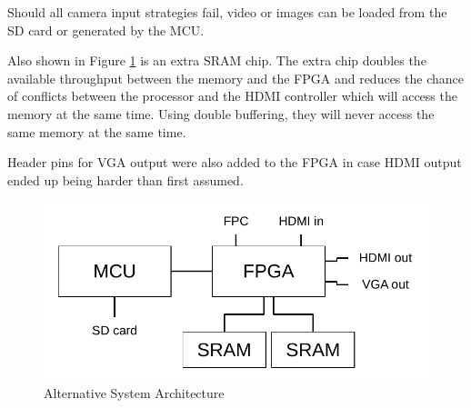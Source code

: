 Should all camera input strategies fail, video or images can be loaded from the SD card or generated by the MCU.

Also shown in Figure \ref{fig:SystemArchitectureAlternative} is an extra SRAM chip.
The extra chip doubles the available throughput between the memory and the FPGA and reduces the chance of conflicts between the processor and the HDMI controller which will access the memory at the same time. Using double buffering, they will never access the same memory at the same time.

Header pins for VGA output were also added to the FPGA in case HDMI output ended up being harder than first assumed.

\begin{figure}
    \centering
    \includegraphics{img/SystemArchitectureAlternative.pdf}
    \caption{Alternative System Architecture}
    \label{fig:SystemArchitectureAlternative}
\end{figure}

